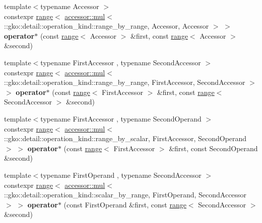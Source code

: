 \begin{DoxyCompactItemize}
\item 
\mbox{\label{namespacegko_a2723c0333fc2349178c8bd33a13d72b8}} 
{\footnotesize template$<$typename Accessor $>$ }\\constexpr \hyperlink{classgko_1_1range}{range}$<$ \hyperlink{structgko_1_1accessor_1_1mul}{accessor\+::mul}$<$ \+::gko\+::detail\+::operation\+\_\+kind\+::range\+\_\+by\+\_\+range, Accessor, Accessor $>$ $>$ {\bfseries operator$\ast$} (const \hyperlink{classgko_1_1range}{range}$<$ Accessor $>$ \&first, const \hyperlink{classgko_1_1range}{range}$<$ Accessor $>$ \&second)
\item 
\mbox{\label{namespacegko_a86b3c1ce84d54e93c170a0a993434349}} 
{\footnotesize template$<$typename First\+Accessor , typename Second\+Accessor $>$ }\\constexpr \hyperlink{classgko_1_1range}{range}$<$ \hyperlink{structgko_1_1accessor_1_1mul}{accessor\+::mul}$<$ \+::gko\+::detail\+::operation\+\_\+kind\+::range\+\_\+by\+\_\+range, First\+Accessor, Second\+Accessor $>$ $>$ {\bfseries operator$\ast$} (const \hyperlink{classgko_1_1range}{range}$<$ First\+Accessor $>$ \&first, const \hyperlink{classgko_1_1range}{range}$<$ Second\+Accessor $>$ \&second)
\item 
\mbox{\label{namespacegko_a1cb48dd84f149784a1b8827d5cc1a190}} 
{\footnotesize template$<$typename First\+Accessor , typename Second\+Operand $>$ }\\constexpr \hyperlink{classgko_1_1range}{range}$<$ \hyperlink{structgko_1_1accessor_1_1mul}{accessor\+::mul}$<$ \+::gko\+::detail\+::operation\+\_\+kind\+::range\+\_\+by\+\_\+scalar, First\+Accessor, Second\+Operand $>$ $>$ {\bfseries operator$\ast$} (const \hyperlink{classgko_1_1range}{range}$<$ First\+Accessor $>$ \&first, const Second\+Operand \&second)
\item 
\mbox{\label{namespacegko_aa2fb75dc070c4ea51828628aeec144cc}} 
{\footnotesize template$<$typename First\+Operand , typename Second\+Accessor $>$ }\\constexpr \hyperlink{classgko_1_1range}{range}$<$ \hyperlink{structgko_1_1accessor_1_1mul}{accessor\+::mul}$<$ \+::gko\+::detail\+::operation\+\_\+kind\+::scalar\+\_\+by\+\_\+range, First\+Operand, Second\+Accessor $>$ $>$ {\bfseries operator$\ast$} (const First\+Operand \&first, const \hyperlink{classgko_1_1range}{range}$<$ Second\+Accessor $>$ \&second)

\end{DoxyCompactItemize}
